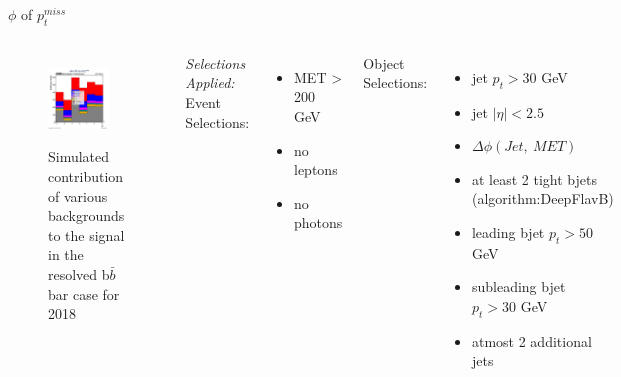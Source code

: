 \documentclass[10pt,xcolor=dvipsnames,aspectratio=169]{beamer}
\begin{document}
\begin{frame}[fragile]{$\phi $ of $p^{miss}_t$ }
  \begin{columns}
    \begin{figure}
      \centering
      \includegraphics[width=0.8\textwidth]{../Backgrounds/plots/SR_Resolved_Backgrounds_met_phi_hist_Combined.png}
      \label{contribution}
      \caption{Simulated contribution of various backgrounds to the signal in the resolved b$ \bar{b} $ bar case for 2018}
    \end{figure}
    \textit{Selections Applied:} \\
    Event Selections:
    \begin{itemize}
      \raggedright 
      \tiny
      \item {MET > 200 GeV}
      \item {no leptons}
      \item {no photons}
    \end{itemize}
    Object Selections:
    \begin{itemize}
      \raggedright 
      \tiny
      \item {jet $p_t > 30 $ GeV}
      \item {jet $| \eta | < 2.5 $}
      \item {$\Delta \phi (Jet, \ MET)$}
      \item {at least 2 tight bjets (algorithm:DeepFlavB)}
      \item {leading bjet $p_t > 50 $ GeV}
      \item {subleading bjet $p_t > 30 $ GeV}
      \item {atmost 2 additional jets}
    \end{itemize}
  \end{columns}
\end{frame}
\end{document}
